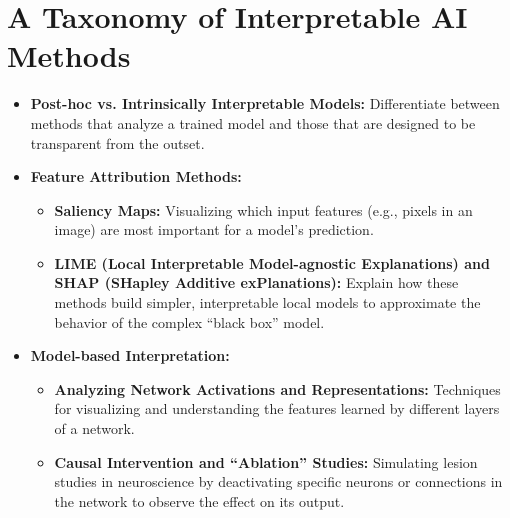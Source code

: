 \documentclass[11pt,a4paper]{article}
\begin{document}
\section{A Taxonomy of Interpretable AI Methods}
\begin{itemize}
    \item \textbf{Post-hoc vs. Intrinsically Interpretable Models:} Differentiate between methods that analyze a trained model and those that are designed to be transparent from the outset.
    \item \textbf{Feature Attribution Methods:}
        \begin{itemize}
            \item \textbf{Saliency Maps:} Visualizing which input features (e.g., pixels in an image) are most important for a model's prediction.
            \item \textbf{LIME (Local Interpretable Model-agnostic Explanations) and SHAP (SHapley Additive exPlanations):} Explain how these methods build simpler, interpretable local models to approximate the behavior of the complex ``black box'' model.
        \end{itemize}
    \item \textbf{Model-based Interpretation:}
        \begin{itemize}
            \item \textbf{Analyzing Network Activations and Representations:} Techniques for visualizing and understanding the features learned by different layers of a network.
            \item \textbf{Causal Intervention and ``Ablation'' Studies:} Simulating lesion studies in neuroscience by deactivating specific neurons or connections in the network to observe the effect on its output.
        \end{itemize}
\end{itemize}
\end{document}
